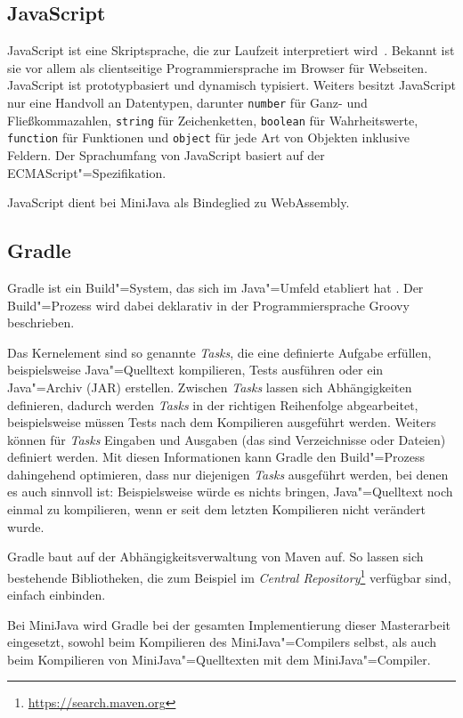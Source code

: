 \subsection{JavaScript}
JavaScript ist eine Skriptsprache, die zur Laufzeit interpretiert wird \cite{MDNJavaScript}. Bekannt ist sie vor allem als clientseitige Programmiersprache im Browser für Webseiten. JavaScript ist prototypbasiert und dynamisch typisiert. Weiters besitzt JavaScript nur eine Handvoll an Datentypen, darunter \lstinline{number} für Ganz- und Fließkommazahlen, \lstinline{string} für Zeichenketten, \lstinline{boolean} für Wahrheitswerte, \lstinline{function} für Funktionen und \lstinline{object} für jede Art von Objekten inklusive Feldern. Der Sprachumfang von JavaScript basiert auf der ECMAScript"=Spezifikation.

JavaScript dient bei MiniJava als Bindeglied zu WebAssembly.

\subsection{Gradle}
Gradle ist ein Build"=System, das sich im Java"=Umfeld etabliert hat \cite{Gradle}. Der Build"=Prozess wird dabei deklarativ in der Programmiersprache Groovy beschrieben.

Das Kernelement sind so genannte \emph{Tasks}, die eine definierte Aufgabe erfüllen, beispielsweise Java"=Quelltext kompilieren, Tests ausführen oder ein Java"=Archiv (JAR) erstellen. Zwischen \emph{Tasks} lassen sich Abhängigkeiten definieren, dadurch werden \emph{Tasks} in der richtigen Reihenfolge abgearbeitet, beispielsweise müssen Tests nach dem Kompilieren ausgeführt werden. Weiters können für \emph{Tasks} Eingaben und Ausgaben (das sind Verzeichnisse oder Dateien) definiert werden. Mit diesen Informationen kann Gradle den Build"=Prozess dahingehend optimieren, dass nur diejenigen \emph{Tasks} ausgeführt werden, bei denen es auch sinnvoll ist: Beispielsweise würde es nichts bringen, Java"=Quelltext noch einmal zu kompilieren, wenn er seit dem letzten Kompilieren nicht verändert wurde.

Gradle baut auf der Abhängigkeitsverwaltung von Maven auf. So lassen sich bestehende Bibliotheken, die zum Beispiel im \emph{Central Repository}\footnote{\url{https://search.maven.org}} verfügbar sind, einfach einbinden.

Bei MiniJava wird Gradle bei der gesamten Implementierung dieser Masterarbeit eingesetzt, sowohl beim Kompilieren des MiniJava"=Compilers selbst, als auch beim Kompilieren von MiniJava"=Quelltexten mit dem MiniJava"=Compiler.

